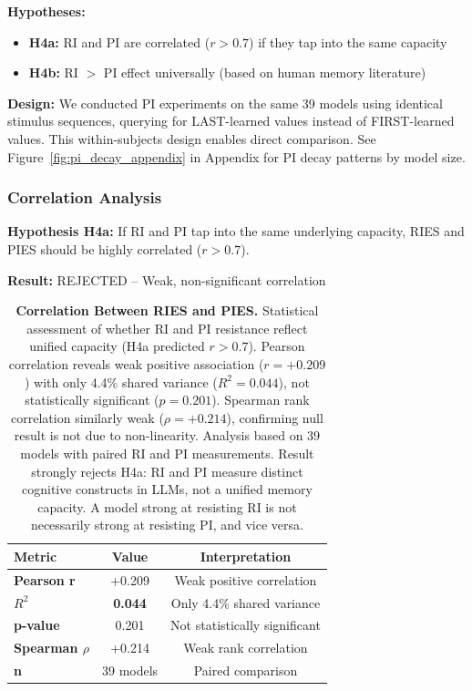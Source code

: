 \documentclass{article}
\begin{document}
\textbf{Hypotheses:}
\begin{itemize}[itemsep=2pt,topsep=3pt,parsep=0pt]
    \item \textbf{H4a:} RI and PI are correlated ($r > 0.7$) if they tap into the same capacity
    \item \textbf{H4b:} RI $>$ PI effect universally (based on human memory literature)
\end{itemize}

\textbf{Design:} We conducted PI experiments on the same 39 models using identical stimulus sequences, querying for LAST-learned values instead of FIRST-learned values. This within-subjects design enables direct comparison. See Figure~\ref{fig:pi_decay_appendix} in Appendix for PI decay patterns by model size.

\subsubsection{Correlation Analysis}

\textbf{Hypothesis H4a:} If RI and PI tap into the same underlying capacity, RIES and PIES should be highly correlated ($r > 0.7$).

\textbf{Result:} REJECTED -- Weak, non-significant correlation

\begin{table}[t]
\centering
\caption{\textbf{Correlation Between RIES and PIES.}
Statistical assessment of whether RI and PI resistance reflect unified capacity (H4a predicted $r > 0.7$).
Pearson correlation reveals weak positive association ($r = +0.209$) with only 4.4\% shared variance ($R^2 = 0.044$), not statistically significant ($p = 0.201$).
Spearman rank correlation similarly weak ($\rho = +0.214$), confirming null result is not due to non-linearity.
Analysis based on 39 models with paired RI and PI measurements.
Result strongly rejects H4a: RI and PI measure distinct cognitive constructs in LLMs, not a unified memory capacity.
A model strong at resisting RI is not necessarily strong at resisting PI, and vice versa.}
\begin{tabular}{lcc}
\toprule
Metric & Value & Interpretation \\
\midrule
\textbf{Pearson r} & +0.209 & Weak positive correlation \\
\textbf{$R^2$} & \textbf{0.044} & Only 4.4\% shared variance \\
\textbf{p-value} & 0.201 & Not statistically significant \\
\textbf{Spearman $\rho$} & +0.214 & Weak rank correlation \\
\textbf{n} & 39 models & Paired comparison \\
\bottomrule
\end{tabular}
\end{table}
\end{document}

